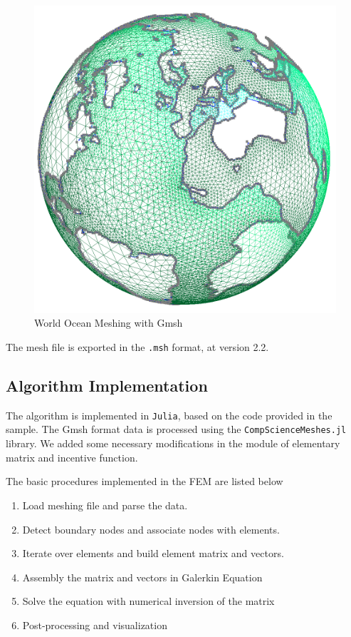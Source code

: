 \documentclass[a4paper]{article}
\begin{document}
\begin{figure}[H]
    \includegraphics[width=0.83\linewidth]{./images/mesh.png}
    \centering
    \caption{World Ocean Meshing with Gmsh}
    \label{fig:mesh}
\end{figure}
    

The mesh file is exported in the \verb|.msh| format, at version 2.2.


\subsection{Algorithm Implementation}
The algorithm is implemented in \verb|Julia|, based on the code provided in the sample.
The Gmsh format data is processed using the \verb|CompScienceMeshes.jl| library.
We added some necessary modifications in the module of elementary matrix and incentive function.

The basic procedures implemented in the FEM are listed below
\begin{enumerate}
    \item Load meshing file and parse the data.
    \item Detect boundary nodes and associate nodes with elements.
    \item Iterate over elements and build element matrix and vectors.
    \item Assembly the matrix and vectors in Galerkin Equation
    \item Solve the equation with numerical inversion of the matrix
    \item Post-processing and visualization
\end{enumerate}
\end{document}
